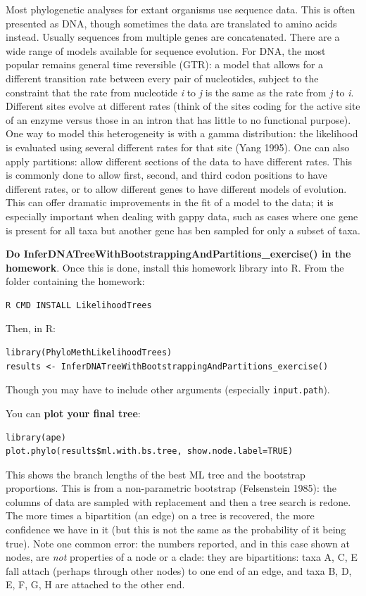 \documentclass[]{article}
\theoremstyle{definition}
\theoremstyle{definition}
\theoremstyle{definition}
\theoremstyle{remark}
\begin{document}
Most phylogenetic analyses for extant organisms use sequence data. This
is often presented as DNA, though sometimes the data are translated to
amino acids instead. Usually sequences from multiple genes are
concatenated. There are a wide range of models available for sequence
evolution. For DNA, the most popular remains general time reversible
(GTR): a model that allows for a different transition rate between every
pair of nucleotides, subject to the constraint that the rate from
nucleotide \emph{i} to \emph{j} is the same as the rate from \emph{j} to
\emph{i}. Different sites evolve at different rates (think of the sites
coding for the active site of an enzyme versus those in an intron that
has little to no functional purpose). One way to model this
heterogeneity is with a gamma distribution: the likelihood is evaluated
using several different rates for that site (Yang 1995). One can also
apply partitions: allow different sections of the data to have different
rates. This is commonly done to allow first, second, and third codon
positions to have different rates, or to allow different genes to have
different models of evolution. This can offer dramatic improvements in
the fit of a model to the data; it is especially important when dealing
with gappy data, such as cases where one gene is present for all taxa
but another gene has ben sampled for only a subset of taxa.

\textbf{Do InferDNATreeWithBootstrappingAndPartitions\_exercise() in the
homework}. Once this is done, install this homework library into R. From
the folder containing the homework:

\begin{verbatim}
R CMD INSTALL LikelihoodTrees
\end{verbatim}

Then, in R:

\begin{verbatim}
library(PhyloMethLikelihoodTrees)
results <- InferDNATreeWithBootstrappingAndPartitions_exercise()
\end{verbatim}

Though you may have to include other arguments (especially
\texttt{input.path}).

You can \textbf{plot your final tree}:

\begin{verbatim}
library(ape)
plot.phylo(results$ml.with.bs.tree, show.node.label=TRUE)
\end{verbatim}

This shows the branch lengths of the best ML tree and the bootstrap
proportions. This is from a non-parametric bootstrap (Felsenstein 1985):
the columns of data are sampled with replacement and then a tree search
is redone. The more times a bipartition (an edge) on a tree is
recovered, the more confidence we have in it (but this is not the same
as the probability of it being true). Note one common error: the numbers
reported, and in this case shown at nodes, are \emph{not} properties of
a node or a clade: they are bipartitions: taxa A, C, E fall attach
(perhaps through other nodes) to one end of an edge, and taxa B, D, E,
F, G, H are attached to the other end.
\end{document}
